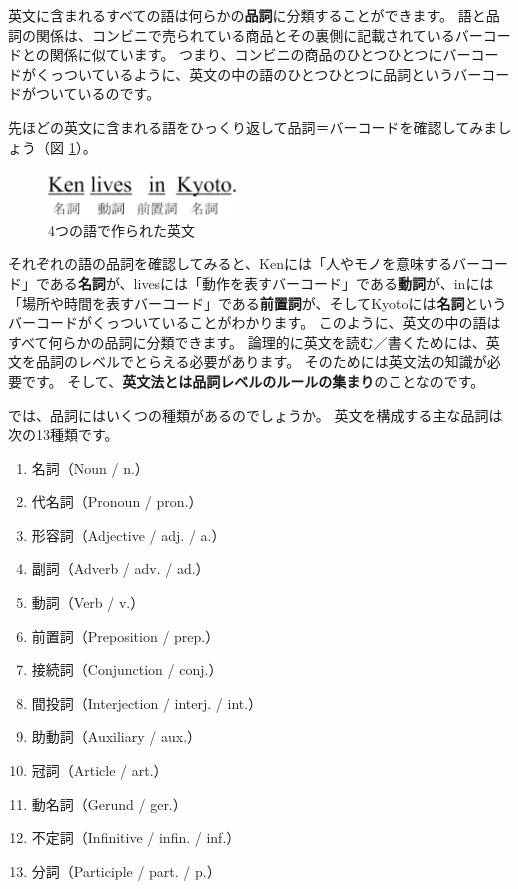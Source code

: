 \documentclass[titlepage]{jsarticle}
\begin{document}
 英文に含まれるすべての語は何らかの{\bf 品詞}に分類することができます。
 語と品詞の関係は、コンビニで売られている商品とその裏側に記載されているバーコードとの関係に似ています。
 つまり、コンビニの商品のひとつひとつにバーコードがくっついているように、英文の中の語のひとつひとつに品詞というバーコードがついているのです。

 先ほどの英文に含まれる語をひっくり返して品詞＝バーコードを確認してみましょう（図 \ref{fig2}）。

 \begin{figure}[htbp]
  \begin{center}
   \includegraphics[width=5cm]{./figure/fig2.pdf}
   \caption{4つの語で作られた英文}
   \label{fig2}
  \end{center}
 \end{figure}


 それぞれの語の品詞を確認してみると、Kenには「人やモノを意味するバーコード」である{\bf 名詞}が、livesには「動作を表すバーコード」である{\bf 動詞}が、inには「場所や時間を表すバーコード」である{\bf 前置詞}が、そしてKyotoには{\bf 名詞}というバーコードがくっついていることがわかります。
 このように、英文の中の語はすべて何らかの品詞に分類できます。
 論理的に英文を読む／書くためには、英文を品詞のレベルでとらえる必要があります。
 そのためには英文法の知識が必要です。
 そして、{\bf 英文法とは品詞レベルのルールの集まり}のことなのです。

 では、品詞にはいくつの種類があるのでしょうか。
 英文を構成する主な品詞は次の13種類です。

 \begin{enumerate}
  \item 名詞（Noun / n.）
  \item 代名詞（Pronoun / pron.）
  \item 形容詞（Adjective / adj. / a.）
  \item 副詞（Adverb / adv. / ad.）
  \item 動詞（Verb / v.）
  \item 前置詞（Preposition / prep.）
  \item 接続詞（Conjunction / conj.）
  \item 間投詞（Interjection / interj. / int.）
  \item 助動詞（Auxiliary / aux.）
  \item 冠詞（Article / art.）
  \item 動名詞（Gerund / ger.）
  \item 不定詞（Infinitive / infin. / inf.）
  \item 分詞（Participle / part. / p.）
 \end{enumerate}
 
\end{document}
